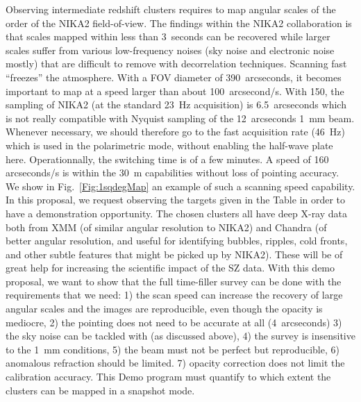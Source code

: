\documentclass[10pt,a4paper,twoside,graphicx,color]{article}
\begin{document}
\vspace{-0.1cm}  Observing intermediate redshift clusters requires to map
angular scales of the order of the NIKA2 field-of-view. The findings
within the NIKA2 collaboration is that scales mapped within less than
3~seconds can be recovered while larger scales suffer from various
low-frequency noises (sky noise and electronic noise mostly) that are
difficult to remove with decorrelation techniques. Scanning fast
``freezes'' the atmosphere. With a FOV diameter of 390~arcseconds, it
becomes important to map at a speed larger than about
100~arcsecond/s. With 150, the sampling of NIKA2 (at the standard
23~Hz acquisition) is 6.5~arcseconds which is not really compatible
with Nyquist sampling of the 12~arcseconds 1~mm beam. Whenever
necessary, we should therefore go to the fast acquisition rate (46~Hz)
which is used in the polarimetric mode, without enabling the half-wave
plate here. Operationnally, the switching time is of a few minutes. A
speed of 160 arcseconds/s is within the 30~m capabilities without loss
of pointing accuracy. We show in Fig.~\ref{Fig:1sqdegMap} an example
of such a scanning speed capability. In this proposal, we request
observing the targets given in the Table in order to have a
demonstration opportunity. The chosen clusters all have deep X-ray
data both from XMM (of similar angular resolution to NIKA2) and
Chandra (of better angular resolution, and useful for identifying
bubbles, ripples, cold fronts, and other subtle features that might be
picked up by NIKA2). These will be of great help for increasing the
scientific impact of the SZ data. With this demo proposal, we want to
show that the full time-filler survey can be done with the
requirements that we need: 1) the scan speed can increase the recovery
of large angular scales and the images are reproducible, even though
the opacity is mediocre, 2) the pointing does not need to be accurate
at all (4~arcseconds) 3) the sky noise can be tackled with (as
discussed above), 4) the survey is insensitive to the 1~mm conditions,
5) the beam must not be perfect but reproducible, 6) anomalous
refraction should be limited. 7) opacity correction does not limit the
calibration accuracy. This Demo program must quantify to which extent
the clusters can be mapped in a snapshot mode.\\
\end{document}

